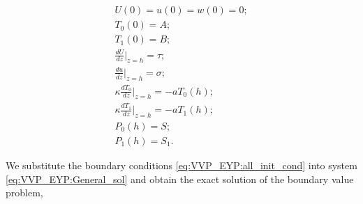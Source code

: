 \begin{gather}

U\left(0\right)=u\left(0\right)=w\left(0\right)=0;

\\

T_0\left(0\right)=A;

\\

T_1\left(0\right)=B;

\\

\frac{dU}{dz}\Bigr|_{z=h}=\tau;

\\

\frac{du}{dz}\Bigr|_{z=h}=\sigma;

       \label{eq:VVP_EYP:all_init_cond}

\\

\kappa \frac{dT_0}{dz}\Bigr|_{z=h}=-aT_0 (h) ;

\\

\kappa \frac{dT_1}{dz}\Bigr|_{z=h}=-aT_1 (h) ;	

\\

P_0 (h) =S;

\\

P_1 (h) =S_1.

 \end{gather}

We substitute the boundary conditions \eqref{eq:VVP_EYP:all_init_cond} into system \eqref{eq:VVP_EYP:General_sol} and obtain the exact solution of the boundary value problem,

